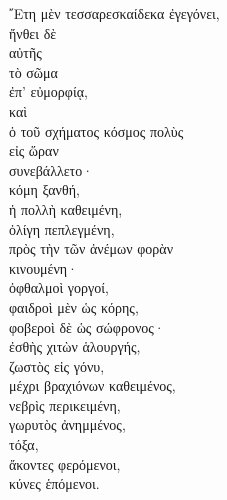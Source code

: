 {\large
\begin{greek}
\noindent ῎Ετη μὲν τεσσαρεσκαίδεκα ἐγεγόνει, \\
ἤνθει δὲ \\
\tabto{2em} αὐτῆς \\
τὸ σῶμα \\
\tabto{2em} ἐπ' εὐμορφίᾳ,\\
καὶ\\
ὁ τοῦ σχήματος κόσμος πολὺς \\
εἰς ὥραν \\
συνεβάλλετο·\\
κόμη ξανθή, \\
\tabto{2em} ἡ πολλὴ καθειμένη, \\
\tabto{2em} ὀλίγη πεπλεγμένη, \\
\tabto{4em} πρὸς τὴν τῶν ἀνέμων φορὰν \\
\tabto{4em} κινουμένη· \\
ὀφθαλμοὶ γοργοί, \\
\tabto{2em} φαιδροὶ μὲν ὡς κόρης, \\
\tabto{2em} φοβεροὶ δὲ ὡς σώφρονος·\\
ἐσθὴς χιτὼν ἁλουργής, \\
\tabto{2em} ζωστὸς εἰς γόνυ, \\
\tabto{2em} μέχρι βραχιόνων καθειμένος,\\
νεβρὶς περικειμένη, \\
γωρυτὸς ἀνημμένος, \\
τόξα, \\
ἄκοντες φερόμενοι, \\
κύνες ἑπόμενοι. \\

\end{greek}
}

